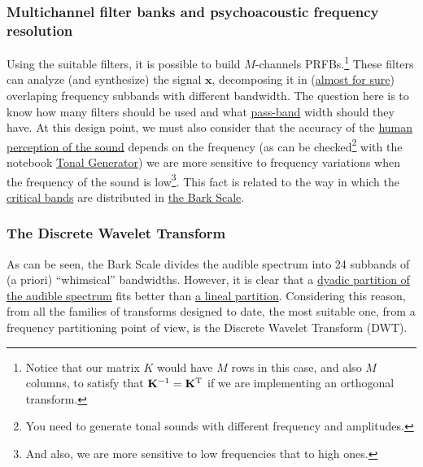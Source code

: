 
\subsubsection{Multichannel filter banks and psychoacoustic frequency resolution}

Using the suitable filters, it is possible to build $M$-channels
PRFBs.\footnote{Notice that our matrix $K$ would have $M$ rows in this
  case, and also $M$ columns, to satisfy that
  ${\mathbf K}^{-1}={\mathbf K}^{\text T}$ if we are implementing an
  orthogonal transform.}  These filters can analyze (and synthesize)
the signal ${\mathbf x}$, decomposing it in
(\href{https://en.wikipedia.org/wiki/Low-pass_filter#Ideal_and_real_filters}{almost
  for sure}) overlaping frequency subbands with different
bandwidth. The question here is to know how many filters should be
used and what
\href{https://en.wikipedia.org/wiki/Band-pass_filter}{pass-band} width
should they have. At this design point, we must also consider that the
accuracy of the
\href{https://en.wikipedia.org/wiki/Psychoacoustics}{human perception
  of the sound} depends on the frequency (as can be
checked\footnote{You need to generate tonal sounds with different
  frequency and amplitudes.} with the notebook
\href{https://github.com/Tecnologias-multimedia/InterCom/blob/master/tools/tonal_generator.ipynb}{Tonal
  Generator}) we are more sensitive to frequency variations when the
frequency of the sound is low\footnote{And also, we are more sensitive
  to low frequencies that to high ones.}. This fact is related to
the way in which the
\href{https://en.wikipedia.org/wiki/Critical_band}{critical bands} are
distributed in \href{https://en.wikipedia.org/wiki/Bark_scale}{the
  Bark Scale}.


\subsubsection{The Discrete Wavelet Transform}

As can be seen, the Bark Scale divides the audible spectrum into 24
subbands of (a priori) ``whimsical'' bandwidths. However, it is clear
that a \href{https://en.wikipedia.org/wiki/Octave_band}{dyadic
  partition of the audible spectrum} fits better than
\href{https://en.wikipedia.org/wiki/Wavelet_transform#Principle}{a
  lineal partition}. Considering this reason, from all the families of
transforms designed to date, the most suitable one, from a frequency
partitioning point of view, is the Discrete Wavelet Transform (DWT).

